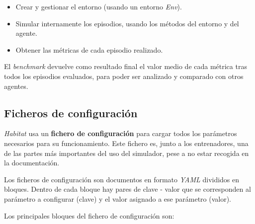 \newpage

\begin{itemize}
	\item Crear y gestionar el entorno (usando un entorno \textit{Env}).
	\item Simular internamente los episodios, usando los métodos del entorno y del agente.
	\item Obtener las métricas de cada episodio realizado.
\end{itemize}

El \textit{benchmark} devuelve como resultado final el valor medio de cada métrica tras todos los episodios evaluados, para poder ser analizado y comparado con otros agentes.

\subsection{Ficheros de configuración}

\textit{Habitat} usa un \textbf{fichero de configuración} para cargar todos los parámetros necesarios para su funcionamiento. Este fichero es, junto a los entrenadores, una de las partes más importantes del uso del simulador, pese a no estar recogida en la documentación.

Los ficheros de configuración son documentos en formato \textit{YAML} \cite{yaml} divididos en bloques. Dentro de cada bloque hay pares de clave - valor que se corresponden al parámetro a configurar (clave) y el valor asignado a ese parámetro (valor).

Los principales bloques del fichero de configuración son:


